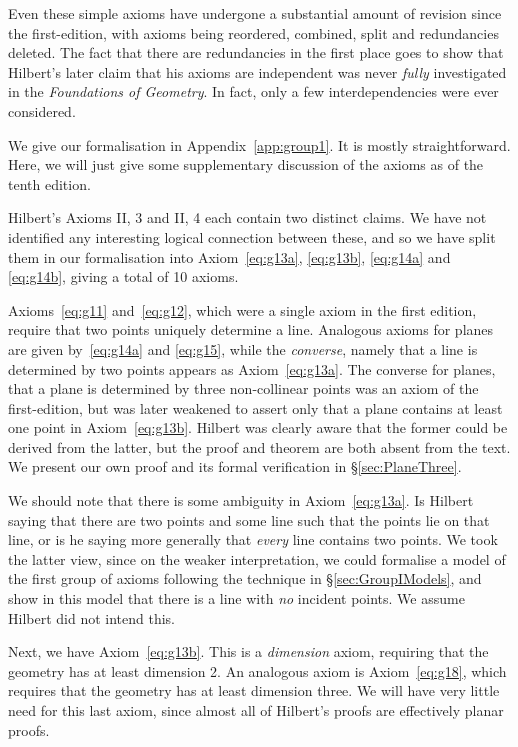 Even these simple axioms have undergone a substantial amount of revision since the first-edition, with axioms being reordered, combined, split and redundancies deleted. The fact that there are redundancies in the first place goes to show that Hilbert's later claim that his axioms are independent was never \emph{fully} investigated in the \emph{Foundations of Geometry}. In fact, only a few interdependencies were ever considered.

We give our formalisation in Appendix~\ref{app:group1}. It is mostly straightforward. Here, we will just give some supplementary discussion of the axioms as of the tenth edition.

Hilbert's Axioms II, 3 and II, 4 each contain two distinct claims. We have not identified any interesting logical connection between these, and so we have split them in our formalisation into Axiom~\ref{eq:g13a}, \ref{eq:g13b}, \ref{eq:g14a} and \ref{eq:g14b}, giving a total of 10 axioms. 

Axioms~\ref{eq:g11} and~\ref{eq:g12}, which were a single axiom in the first edition, require that two points uniquely determine a line. Analogous axioms for planes are given by~\ref{eq:g14a} and \ref{eq:g15}, while the \emph{converse}, namely that a line is determined by two points appears as Axiom~\ref{eq:g13a}. The converse for planes, that a plane is determined by three non-collinear points was an axiom of the first-edition, but was later weakened to assert only that a plane contains at least one point in Axiom~\ref{eq:g13b}. Hilbert was clearly aware that the former could be derived from the latter, but the proof and theorem are both absent from the text. We present our own proof and its formal verification in \S\ref{sec:PlaneThree}.

We should note that there is some ambiguity in Axiom~\ref{eq:g13a}. Is Hilbert saying that there are two points and some line such that the points lie on that line, or is he saying more generally that \emph{every} line contains two points. We took the latter view, since on the weaker interpretation, we could formalise a model of the first group of axioms following the technique in \S\ref{sec:GroupIModels}, and show in this model that there is a line with \emph{no} incident points. We assume Hilbert did not intend this. 

Next, we have Axiom~\ref{eq:g13b}. This is a \emph{dimension} axiom, requiring that the geometry has at least dimension 2. An analogous axiom is Axiom~\ref{eq:g18}, which requires that the geometry has at least dimension three. We will have very little need for this last axiom, since almost all of Hilbert's proofs are effectively planar proofs.


